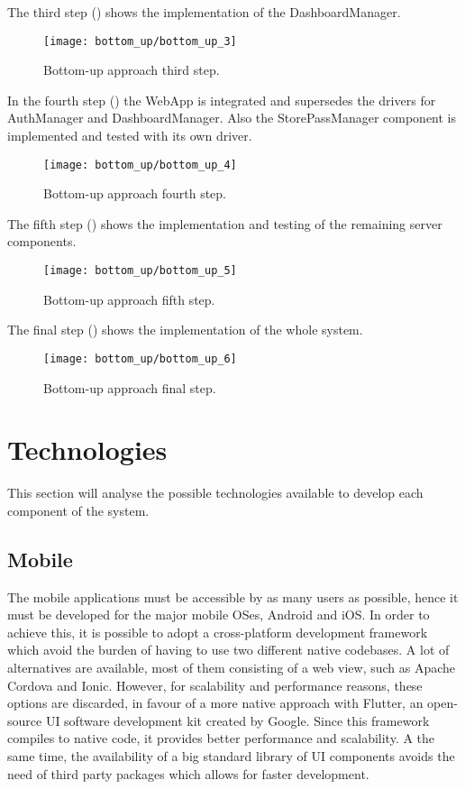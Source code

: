 The third step () shows the implementation of the DashboardManager.
\begin{figure}[H]
	\centering
	\texttt{[image: bottom\_up/bottom\_up\_3]}
	\caption{Bottom-up approach third step.}
	\label{fig:bottom_up_3}
\end{figure}

In the fourth step () the WebApp is integrated and supersedes the drivers for AuthManager and DashboardManager. Also the StorePassManager component is implemented and tested with its own driver.
\begin{figure}[H]
	\centering
	\texttt{[image: bottom\_up/bottom\_up\_4]}
	\caption{Bottom-up approach fourth step.}
	\label{fig:bottom_up_4}
\end{figure}

\clearpage

The fifth step () shows the implementation and testing of the remaining server components.
\begin{figure}[H]
	\centering
	\texttt{[image: bottom\_up/bottom\_up\_5]}
	\caption{Bottom-up approach fifth step.}
	\label{fig:bottom_up_5}
\end{figure}

\clearpage

The final step () shows the implementation of the whole system.
\begin{figure}[H]
	\centering
	\texttt{[image: bottom\_up/bottom\_up\_6]}
	\caption{Bottom-up approach final step.}
	\label{fig:bottom_up_6}
\end{figure}

\clearpage

\section{Technologies}\label{iit:tech}
This section will analyse the possible technologies available to develop each component of the system.

\subsection{Mobile}
The mobile applications must be accessible by as many users as possible, hence it must be developed for the major mobile OSes, Android and iOS.
In order to achieve this, it is possible to adopt a cross-platform development framework which  avoid the burden of having to use two different native codebases.
A lot of alternatives are available, most of them consisting of a web view, such as Apache Cordova and Ionic. 
However, for scalability and performance reasons, these options are discarded, in favour of a more native approach with Flutter, an open-source UI software development kit created by Google.
Since this framework compiles to native code, it provides better performance and scalability. A the same time, the availability of a big standard library of UI components avoids the need of third party packages which allows for faster development.

